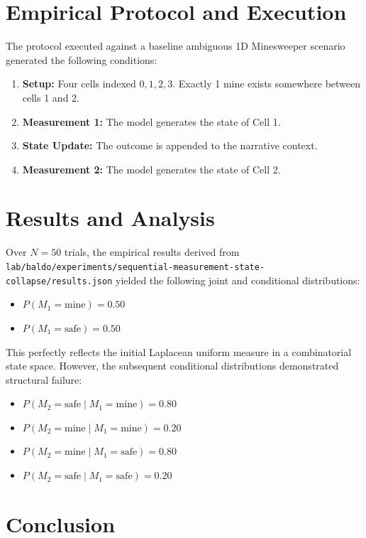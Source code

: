 \documentclass[12pt,a4paper]{article}
\begin{document}
\section{Empirical Protocol and Execution}

The protocol executed against a baseline ambiguous 1D Minesweeper scenario generated the following conditions:
\begin{enumerate}
    \item \textbf{Setup:} Four cells indexed $0, 1, 2, 3$. Exactly 1 mine exists somewhere between cells 1 and 2.
    \item \textbf{Measurement 1:} The model generates the state of Cell 1.
    \item \textbf{State Update:} The outcome is appended to the narrative context.
    \item \textbf{Measurement 2:} The model generates the state of Cell 2.
\end{enumerate}

\section{Results and Analysis}

Over $N=50$ trials, the empirical results derived from \texttt{lab/baldo/experiments/sequential-measurement-state-collapse/results.json} yielded the following joint and conditional distributions:

\begin{itemize}
    \item $P(M_1 = \text{mine}) = 0.50$
    \item $P(M_1 = \text{safe}) = 0.50$
\end{itemize}

This perfectly reflects the initial Laplacean uniform measure in a combinatorial state space. However, the subsequent conditional distributions demonstrated structural failure:

\begin{itemize}
    \item $P(M_2 = \text{safe} \mid M_1 = \text{mine}) = 0.80$
    \item $P(M_2 = \text{mine} \mid M_1 = \text{mine}) = 0.20$
    \item $P(M_2 = \text{mine} \mid M_1 = \text{safe}) = 0.80$
    \item $P(M_2 = \text{safe} \mid M_1 = \text{safe}) = 0.20$
\end{itemize}

\section{Conclusion}
\end{document}

